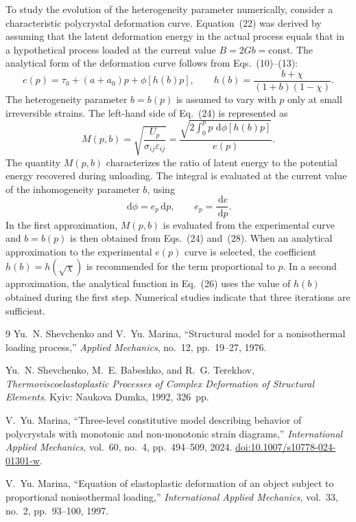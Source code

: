 \documentclass[11pt,a4paper]{article}
\numberwithin{equation}{section}
\newcommand{\dd}{\,\mathrm{d}}
\begin{document}
To study the evolution of the heterogeneity parameter numerically, consider a characteristic polycrystal deformation curve. Equation~(22) was derived by assuming that the latent deformation energy in the actual process equals that in a hypothetical process loaded at the current value $B=2Gb=\text{const}$. The analytical form of the deformation curve follows from Eqs.~(10)--(13):
\begin{equation}
 e(p)=\tau_0+(a+a_0)p+\phi[h(b)p],
 \qquad
 h(b)=\frac{b+\chi}{(1+b)(1-\chi)}.
\end{equation}
The heterogeneity parameter $b=b(p)$ is assumed to vary with $p$ only at small irreversible strains. The left-hand side of Eq.~(24) is represented as
\begin{equation}
 M(p,b)
 =\sqrt{\frac{U_p}{\sigma_{ij}\varepsilon_{ij}}}
 =\frac{\sqrt{2\int_0^p p\,\dd\phi[h(b)p]}}{e(p)}.
\end{equation}
The quantity $M(p,b)$ characterizes the ratio of latent energy to the potential energy recovered during unloading. The integral is evaluated at the current value of the inhomogeneity parameter $b$, using
\begin{equation}
 \dd\phi=e_p\dd p,
 \qquad e_p=\frac{\dd e}{\dd p}.
\end{equation}
In the first approximation, $M(p,b)$ is evaluated from the experimental curve and $b=b(p)$ is then obtained from Eqs.~(24) and~(28). When an analytical approximation to the experimental $e(p)$ curve is selected, the coefficient $h(b)=h(\sqrt\chi)$ is recommended for the term proportional to $p$. In a second approximation, the analytical function in Eq.~(26) uses the value of $h(b)$ obtained during the first step. Numerical studies indicate that three iterations are sufficient.

\begin{thebibliography}{9}
Yu.~N. Shevchenko and V.~Yu. Marina,
``Structural model for a nonisothermal loading process,''
\emph{Applied Mechanics}, no.~12, pp.~19--27, 1976.

Yu.~N. Shevchenko, M.~E. Babeshko, and R.~G. Terekhov,
\emph{Thermoviscoelastoplastic Processes of Complex Deformation of Structural Elements}.
Kyiv: Naukova Dumka, 1992, 326~pp.

V.~Yu. Marina,
``Three-level constitutive model describing behavior of polycrystals with monotonic and non-monotonic strain diagrams,''
\emph{International Applied Mechanics}, vol.~60, no.~4, pp.~494--509, 2024.
\href{https://doi.org/10.1007/s10778-024-01301-w}{doi:10.1007/s10778-024-01301-w}.

V.~Yu. Marina,
``Equation of elastoplastic deformation of an object subject to proportional nonisothermal loading,''
\emph{International Applied Mechanics}, vol.~33, no.~2, pp.~93--100, 1997.
\end{thebibliography}
\end{document}
